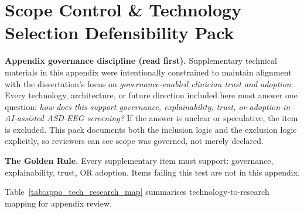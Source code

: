 

\section*{Scope Control \& Technology Selection Defensibility Pack}
\label{sec:scope_defensibility_pack}
\label{chap:appendix_rgaig_architecture}  %

\noindent\textbf{Appendix governance discipline (read first).} Supplementary technical materials in this appendix were intentionally constrained to maintain alignment with the dissertation's focus on \emph{governance-enabled clinician trust and adoption}. Every technology, architecture, or future direction included here must answer one question: \emph{how does this support governance, explainability, trust, or adoption in AI-assisted ASD-EEG screening?} If the answer is unclear or speculative, the item is excluded. This pack documents both the inclusion logic and the exclusion logic explicitly, so reviewers can see scope was governed, not merely declared.

\noindent\textbf{The Golden Rule.} Every supplementary item must support: governance, explainability, trust, OR adoption. Items failing this test are not in this appendix.

\noindent Table~\ref{tab:appo_tech_research_map} summarises technology-to-research mapping for appendix review.

